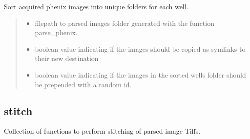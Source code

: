 \documentclass[a4paper,10pt,english,openany,oneside]{sphinxmanual}
\begin{document}
\begin{fulllineitems}
\label{\detokenize{pages/modules:sparcstools.parse.sort_wells}}
\pysigstartsignatures
{}
\pysigstopsignatures
\sphinxAtStartPar
Sort acquired phenix images into unique folders for each well.
\begin{quote}\begin{description}
\begin{itemize}
\item {} 
\sphinxAtStartPar
{} \textendash{} filepath to parsed images folder generated with the function parse\_phenix.

\item {} 
\sphinxAtStartPar
{} \textendash{} boolean value indicating if the images should be copied as symlinks to their new destination

\item {} 
\sphinxAtStartPar
{} \textendash{} boolean value indicating if the images in the sorted wells folder should be prepended with a random id.

\end{itemize}

\end{description}\end{quote}

\end{fulllineitems}

\label{\detokenize{pages/modules:module-sparcstools.stitch}}

\subsection{stitch}
\label{\detokenize{pages/modules:stitch}}
\sphinxAtStartPar
Collection of functions to perform stitching of parsed image Tiffs.
\end{document}
